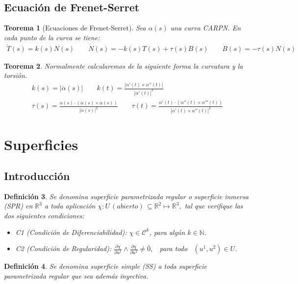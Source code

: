 \documentclass[twoside]{article}
\newtheorem{theorem}{Teorema}[section]
\newtheorem{defi}[theorem]{Definición}
\numberwithin{equation}{section}
\providecommand{\abs}[1]{\lvert#1\rvert}
\begin{document}
\subsection{Ecuación de Frenet-Serret}
\begin{theorem}[Ecuaciones de Frenet-Serret] Sea $\alpha(s)$ una curva CARPN. En cada punto de la curva se tiene:
\begin{gather*}
\dot{T}(s)=k(s)N(s) \qquad \dot{N}(s)=-k(s)T(s)+\tau(s)B(s) \qquad \dot{B}(s)=-\tau(s)N(s)
\end{gather*}
\end{theorem}
\begin{theorem}
Normalmente calcularemos de la siguiente forma la curvatura y la torsión. 
\begin{gather*}
k(s)=\abs{\ddot{\alpha}(s)} \qquad k(t)=\frac{|\alpha'(t)\times\alpha''(t)|}{|\alpha'(t)|^3}\\
\tau(s)=\frac{\dot{\alpha}(s)\cdot(\ddot{\alpha}(s)\times\dddot{\alpha}(s))}{|\ddot{\alpha}(s)|^2} \qquad \tau(t)=\frac{\alpha'(t)\cdot(\alpha''(t)\times\alpha'''(t))}{|\alpha'(t)\times\alpha''(t)|^2}
\end{gather*}
\end{theorem}
\newpage
\section{Superficies}
\subsection{Introducción}
\begin{defi} Se denomina {\em superficie parametrizada regular o superficie inmersa} (SPR) en $\mathbb{R}^3$ a toda aplicación $\chi : U \, (abierto) \, \subseteq \mathbb{R}^2 \mapsto \mathbb{R}^3,$ tal que verifique las dos siguientes condiciones:
\begin{itemize}
\item C1 (Condición de Diferenciabilidad): $\chi \in \mathcal{C}^k$, para algún $k \in \mathbb{N}$.
\item C2 (Condición de Regularidad): $\frac{\partial \chi}{\partial u^1} \wedge \frac{\partial \chi}{\partial u^2} \neq \bar{0},$ \, para todo \, $(u^1, u^2) \in U$.
\end{itemize}
\end{defi}


\begin{defi} Se denomina {\em superficie simple} (SS) a toda superficie parametrizada regular que sea además inyectiva.
\end{defi}
\end{document}

